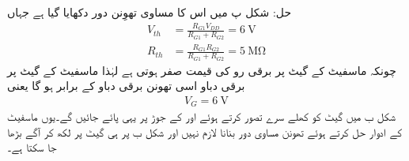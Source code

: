 حل:	شکل  پ میں اس کا مساوی تھوِنن دور دکھایا گیا ہے جہاں
\begin{align*}
V_{th}&=\frac{R_{G1} V_{DD}}{R_{G1}+R_{G2}}=\SI{6}{\volt}\\
R_{th}&=\frac{R_{G1} R_{G2}}{R_{G1}+R_{G2}}=\SI{5}{\mega \ohm}
\end{align*}
چونکہ ماسفیٹ کے گیٹ پر برقی رو کی قیمت صفر ہوتی ہے    لہٰذا ماسفیٹ کے گیٹ پر برقی دباو اسی تھونن برقی دباو کے برابر ہو گا یعنی
\begin{align*}
V_G=\SI{6}{\volt}
\end{align*}
شکل  ب میں گیٹ کو کھلے سرے تصور کرتے ہوئے  اور  کے جوڑ پر یہی  پائے جائیں گے۔یوں ماسفیٹ کے ادوار حل کرتے ہوئے تھونن مساوی دور بنانا لازم نہیں اور شکل  ب پر ہی گیٹ پر  لکھ کر آگے بڑھا جا سکتا ہے۔

